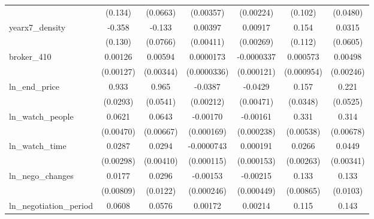 {\begin{tabular}{l*{6}{c}}
            &     (0.134)         &    (0.0663)         &   (0.00357)         &   (0.00224)         &     (0.102)         &    (0.0480)         \\
\addlinespace
yearx7\_density&      -0.358\sym{***}&      -0.133\sym{*}  &     0.00397         &     0.00917\sym{***}&       0.154         &      0.0315         \\
            &     (0.130)         &    (0.0766)         &   (0.00411)         &   (0.00269)         &     (0.112)         &    (0.0605)         \\
\addlinespace
broker\_410  &     0.00126         &     0.00594\sym{*}  &   0.0000173         &  -0.0000337         &    0.000573         &     0.00498\sym{**} \\
            &   (0.00127)         &   (0.00344)         & (0.0000336)         &  (0.000121)         &  (0.000954)         &   (0.00246)         \\
\addlinespace
ln\_end\_price&       0.933\sym{***}&       0.965\sym{***}&     -0.0387\sym{***}&     -0.0429\sym{***}&       0.157\sym{***}&       0.221\sym{***}\\
            &    (0.0293)         &    (0.0541)         &   (0.00212)         &   (0.00471)         &    (0.0348)         &    (0.0525)         \\
\addlinespace
ln\_watch\_people&      0.0621\sym{***}&      0.0643\sym{***}&    -0.00170\sym{***}&    -0.00161\sym{***}&       0.331\sym{***}&       0.314\sym{***}\\
            &   (0.00470)         &   (0.00667)         &  (0.000169)         &  (0.000238)         &   (0.00538)         &   (0.00678)         \\
\addlinespace
ln\_watch\_time&      0.0287\sym{***}&      0.0294\sym{***}&  -0.0000743         &    0.000191         &      0.0266\sym{***}&      0.0449\sym{***}\\
            &   (0.00298)         &   (0.00410)         &  (0.000115)         &  (0.000153)         &   (0.00263)         &   (0.00341)         \\
\addlinespace
ln\_nego\_changes&      0.0177\sym{**} &      0.0296\sym{**} &    -0.00153\sym{***}&    -0.00215\sym{***}&       0.133\sym{***}&       0.133\sym{***}\\
            &   (0.00809)         &    (0.0122)         &  (0.000246)         &  (0.000449)         &   (0.00865)         &    (0.0103)         \\
\addlinespace
ln\_negotiation\_period&      0.0608\sym{***}&      0.0576\sym{***}&     0.00172\sym{***}&     0.00214\sym{***}&       0.115\sym{***}&       0.143\sym{***}\\

\end{tabular}}
